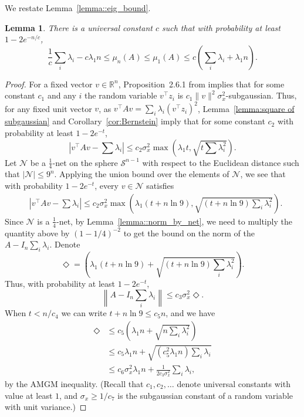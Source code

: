 \documentclass[11pt,notitlepage]{article}
\newcommand\Sc {\mathcal{S}}
\newcommand\Nc {\mathcal{N}}
\newcommand\R {\mathbb{R}}
\newtheorem{lemma}[theorem]{Lemma}
\begin{document}
We restate Lemma~\ref{lemma::eig_bound}.

\begin{lemma}
  There is a universal constant $c$ such that with probability at least $1 - 2e^{-n/c}$,
    \[
      \frac{1}{c}\sum_{i} \lambda_i - c\lambda_1 n
        \leq \mu_n(A) \leq \mu_1(A)
        \leq c\left(\sum_{i} \lambda_i + \lambda_1 n\right).
    \]
\end{lemma}
\begin{proof}
  For a fixed vector $v \in \R^n$, Proposition~2.6.1 from
  \cite{vershynin_2018} implies that for some constant $c_1$ and any
  $i$ the random variable $v^\top z_i$ is
  $c_1\|v\|^2\sigma_x^2$-subgaussian. Thus, for any fixed unit vector
  $v$, as $v^\top A v = \sum_{i} \lambda_i(v^\top z_i)^2$,
  Lemma~\ref{lemma:square of subgaussian} and
  Corollary~\ref{cor:Bernstein} imply that for some constant $c_2$ with
  probability at least $1 - 2e^{-t}$,
    \[
      \left|v^\top A v - \sum \lambda_i\right|
        \leq c_2\sigma_x^2\max\left(\lambda_1 t, \sqrt{t\sum \lambda_i^2}\right).
    \]
  Let $\Nc$ be a $\frac14$-net on the sphere $\Sc^{n-1}$ with respect to the
  Euclidean distance such that $|\Nc|\leq 9^n$.
  Applying the union bound over the elements of $\Nc$, we see that
  with probability $1 - 2e^{-t}$, every $v \in \Nc$ satisfies
   \begin{align*}
    &  \left|v^\top A v - \sum \lambda_i\right| 
        \leq c_2\sigma_x^2\max\left(\lambda_1 (t + n\ln 9), \sqrt{(t + n\ln 9)\sum_{i} \lambda_i^2}\right).
   \end{align*}
  Since $\Nc$ is a $\frac14$-net, by Lemma~\ref{lemma::norm_by_net},
  we need to multiply the quantity above by $(1 - 1/4)^{-2}$ to
  get the bound on the norm of the $A - I_n\sum_{i} \lambda_i$. Denote
  \[
  \Diamond = \left(\lambda_1 (t + n\ln 9)
  + \sqrt{(t + n\ln 9)\sum_{i} \lambda_i^2}\right).
  \]
  Thus, with probability at least $1 - 2e^{-t}$,
  \[
  \left\|A - I_n\sum_i \lambda_i\right\| \leq c_3\sigma_x^2\Diamond.
  \]
  When $t<n/c_4$ we can write $t+n\ln 9\le c_5n$, and we have
    \begin{align*}
      \Diamond
        & \le c_5\left(\lambda_1 n + \sqrt{n\sum_i \lambda_i^2}\right) \\
        & \le c_5\lambda_1 n
          + \sqrt{\left(c_5^2\lambda_1 n\right)
          \sum_i \lambda_i} \\
        & \le c_6\sigma_x^2\lambda_1 n + \frac{1}{2c_3\sigma_x^2}\sum_i \lambda_i,
    \end{align*}
  by the AMGM inequality. (Recall that $c_1,c_2,\ldots$ denote universal
  constants with value at least $1$, and $\sigma_x \geq 1/c_7$ is the
  subgaussian constant of a random variable with unit variance.)
\end{proof}
\end{document}

